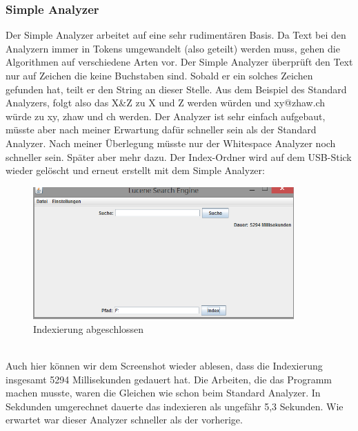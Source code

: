 \documentclass[12pt,a4paper,ngerman]{report}
\begin{document}
\subsubsection*{Simple Analyzer}
Der Simple Analyzer arbeitet auf eine sehr rudimentären Basis. Da Text bei den Analyzern immer in Tokens umgewandelt (also geteilt) werden muss, gehen die Algorithmen auf verschiedene Arten vor. Der Simple Analyzer überprüft den Text nur auf Zeichen die keine Buchstaben sind. Sobald er ein solches Zeichen gefunden hat, teilt er den String an dieser Stelle. Aus dem Beispiel des Standard Analyzers, folgt also das X\&Z zu X und Z werden würden und xy@zhaw.ch würde zu xy, zhaw und ch werden. Der Analyzer ist sehr einfach aufgebaut, müsste aber nach meiner Erwartung dafür schneller sein als der Standard Analyzer. Nach meiner Überlegung müsste nur der Whitespace Analyzer noch schneller sein. Später aber mehr dazu.
\newpage
Der Index-Ordner wird auf dem USB-Stick wieder gelöscht und erneut erstellt mit dem Simple Analyzer:
\begin{figure}[h!]
\centering
\includegraphics[width=10cm]{img/simple-analyzer-index.png}
\caption{Indexierung abgeschlossen\protect\footnotemark}
\end{figure}
\\
Auch hier können wir dem Screenshot wieder ablesen, dass die Indexierung insgesamt 5294 Millisekunden gedauert hat. Die Arbeiten, die das Programm machen musste, waren die Gleichen wie schon beim Standard Analyzer. In Sekdunden umgerechnet dauerte das indexieren als ungefähr 5,3 Sekunden. Wie erwartet war dieser Analyzer schneller als der vorherige.
\end{document}
